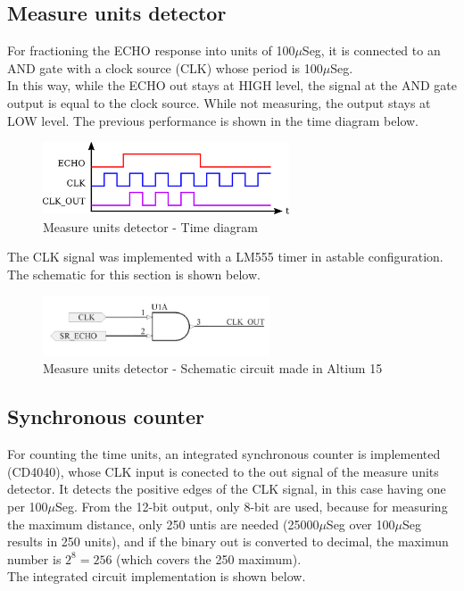 \subsection*{Measure units detector}

For fractioning the ECHO response into units of 100$\mu$Seg, it is 
connected to an AND gate with a clock source (CLK) whose period is 100$\mu$Seg.\\
In this way, while the ECHO out stays at HIGH level, the signal at the AND gate output 
is equal to the clock source. While not measuring, the output stays at LOW level.
The previous performance is shown in the time diagram below.

\begin{figure}[H]
    \begin{centering}
    \includegraphics[width=0.65\textwidth]{CLK_time}
    \par\end{centering}
    \caption{Measure units detector - Time diagram}
\end{figure}

The CLK signal was implemented with a LM555 timer in astable configuration.
The schematic for this section is shown below.

\begin{figure}[H]
    \begin{centering}
    \includegraphics[width=0.6\textwidth]{Unit_Detector}
    \par\end{centering}
    \caption{Measure units detector - Schematic circuit made in Altium 15}
\end{figure}

\subsection*{Synchronous counter}

For counting the time units, an integrated synchronous counter is implemented (CD4040), 
whose CLK input is conected to the out signal of the measure units detector. It detects the 
positive edges of the CLK signal, in this case having one per 100$\mu$Seg. From the 12-bit 
output, only 8-bit are used, because for measuring the maximum distance, only 250 untis are 
needed (25000$\mu$Seg over 100$\mu$Seg results in 250 units), and if the binary out is converted 
to decimal, the maximun number is $2^8 = 256$ (which covers the 250 maximum).\\
The integrated circuit implementation is shown below.

